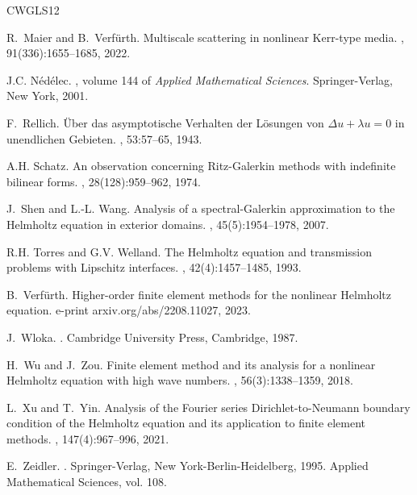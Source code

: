 \documentclass[12pt,DIV=14]{scrartcl}
\renewenvironment{thebibliography}[1]{
\begin{oldthebibliography}{#1}
\setlength{\itemsep}{0em}
\setlength{\parskip}{0em}
}
{
\end{oldthebibliography}
}
\begin{document}
\begin{thebibliography}{CWGLS12}
R.~Maier and B.~Verf{\"{u}}rth.
\newblock Multiscale scattering in nonlinear {K}err-type media.
, 91(336):1655--1685, 2022.

J.C. N{\'e}d{\'e}lec.
, volume 144 of {\em Applied Mathematical Sciences}.
\newblock Springer-Verlag, New York, 2001.

F.~Rellich.
\newblock \"{U}ber das asymptotische {V}erhalten der {L}\"{o}sungen von
  ${\Delta} u + \lambda u = 0$ in unendlichen {G}ebieten.
,
  53:57--65, 1943.

A.H. Schatz.
\newblock An observation concerning {R}itz-{G}alerkin methods with indefinite
  bilinear forms.
, 28(128):959--962, 1974.

J.~Shen and L.-L. Wang.
\newblock Analysis of a spectral-{G}alerkin approximation to the {H}elmholtz
  equation in exterior domains.
, 45(5):1954--1978, 2007.

R.H. Torres and G.V. Welland.
\newblock The {H}elmholtz equation and transmission problems with {L}ipschitz
  interfaces.
, 42(4):1457--1485, 1993.

B.~Verf\"{u}rth.
\newblock Higher-order finite element methods for the nonlinear {H}elmholtz
  equation.
\newblock e-print arxiv.org/abs/2208.11027, 2023.

J.~Wloka.
.
\newblock Cambridge University Press, Cambridge, 1987.

H.~Wu and J.~Zou.
\newblock Finite element method and its analysis for a nonlinear {H}elmholtz
  equation with high wave numbers.
, 56(3):1338--1359, 2018.

L.~Xu and T.~Yin.
\newblock Analysis of the {F}ourier series {D}irichlet-to-{N}eumann boundary
  condition of the {H}elmholtz equation and its application to finite element
  methods.
, 147(4):967--996, 2021.

E.~Zeidler.
.
\newblock Springer-Verlag, New York-Berlin-Heidelberg, 1995.
\newblock Applied Mathematical Sciences, vol. 108.

\end{thebibliography}
\end{document}
